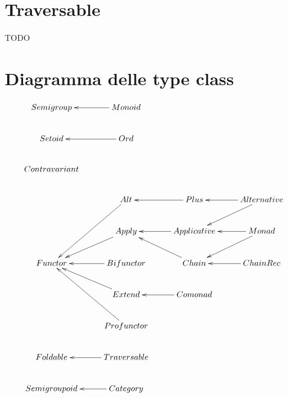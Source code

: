 \documentclass[12pt]{article}
\begin{document}
\section{Traversable}

TODO

\section{Diagramma delle type class}

\[
\xymatrix{
  Semigroup & Monoid \ar[l] \\
  Setoid & Ord \ar[l] \\
  Contravariant \\
  & Alt \ar[ldd] & Plus \ar[l] & Alternative \ar[l] \ar[ld] \\
  & Apply \ar[ld] & Applicative \ar[l] & Monad \ar[l] \ar[ld] \\
  Functor & Bifunctor \ar[l] & Chain \ar[lu] & ChainRec \ar[l] \\
  & Extend \ar[lu] & Comonad \ar[l] \\
  & Profunctor \ar[luu] \\
  Foldable & Traversable \ar[l] \\
  Semigroupoid & Category \ar[l] \\
}
\]
\end{document}

